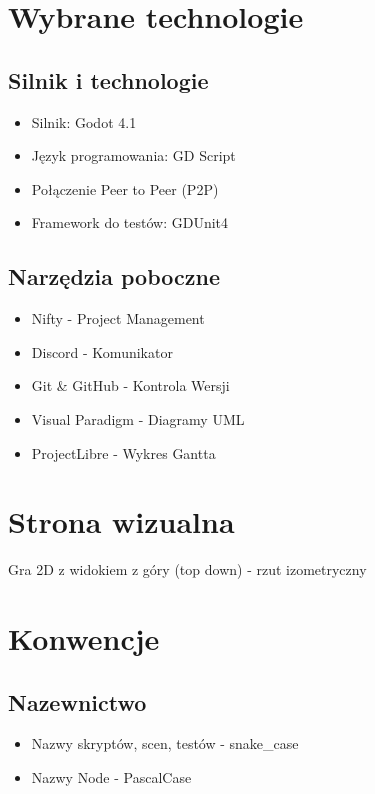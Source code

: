 \documentclass[]{report}
\begin{document}
\section{Wybrane technologie}
\subsection{Silnik i technologie}
	\begin{itemize}
		\item Silnik: Godot 4.1
		\item Język programowania: GD Script
		\item Połączenie Peer to Peer (P2P)
		\item Framework do testów: GDUnit4
	\end{itemize}
\subsection{Narzędzia poboczne}
\begin{itemize}
	\item Nifty - Project Management
	\item Discord - Komunikator
	\item Git \& GitHub - Kontrola Wersji
	\item Visual Paradigm - Diagramy UML
	\item ProjectLibre - Wykres Gantta
\end{itemize}

\section{Strona wizualna}
Gra 2D z widokiem z góry (top down) - rzut izometryczny



\section{Konwencje}
\subsection{Nazewnictwo}
	\begin{itemize}
		\item Nazwy skryptów, scen, testów - snake\_case
		\item Nazwy Node - PascalCase
	
	\end{itemize}
	
\end{document}
